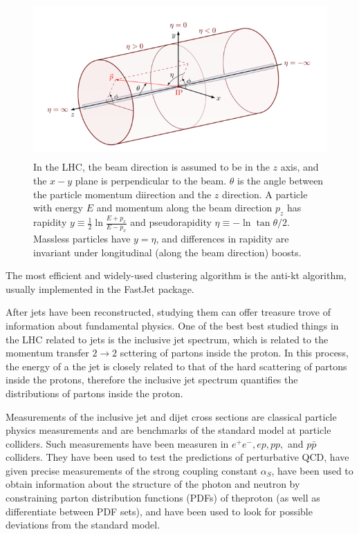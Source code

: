 \begin{figure}
    \centering
    \includegraphics[width=12.5cm,height=6cm]{templates/CMS_coordinates.png}
    \caption{In the LHC, the beam direction is assumed to be in the $z$ axis, and the $x-y$ plane is perpendicular to the beam. $\theta$ is the angle between the particle momentum diirection and the $z$ direction. A particle with energy $E$ and momentum along the beam direction $p_z$ has rapidity $y \equiv \frac{1}{2} \ln \frac{E+p_{x}}{E-p_{x}}$ and pseudorapidity $\eta \equiv-\ln \tan \theta / 2$. Massless particles have $y=\eta$, and differences in rapidity are invariant under longitudinal (along the beam direction) boosts.}
    \label{CMS_coordinates}
\end{figure}
The most efficient and widely-used clustering algorithm is the anti-kt algorithm, usually implemented in the FastJet package.


After jets have been reconstructed, studying them can offer treasure trove of information about fundamental physics. One of the best best studied things in the LHC related to jets is the inclusive jet spectrum, which is related to the momentum transfer $2 \rightarrow 2$ scttering of partons inside the proton. In this process, the energy of a the jet is closely related to that of the hard scattering of partons inside the protons, therefore the inclusive jet spectrum quantifies the distributions of partons inside the proton.




Measurements of the inclusive jet and dijet cross sections are classical particle physics measurements and are benchmarks of the standard model at particle colliders. Such measurements have been measuren in $e^+ e^-, ep, pp,$ and $p \bar{p}$ colliders. They have been used to test the predictions of perturbative QCD, have given precise measurements of the strong coupling constant $\alpha_S$, have been used to obtain information about the structure of the photon and neutron by constraining parton distribution functions (PDFs) of theproton (as well as differentiate between PDF sets), and  have been used to look for possible deviations from the standard model.  








